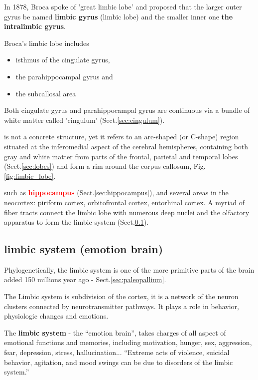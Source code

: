 In 1878, Broca spoke of 'great limbic lobe' and proposed that the larger outer
gyrus be named {\bf limbic gyrus} (limbic lobe) and the smaller inner one {\bf the
intralimbic gyrus}.

Broca's limbic lobe includes 
\begin{itemize}
  \item  isthmus of the cingulate gyrus, 
  
  \item the parahippocampal gyrus and
  
  \item the subcallosal area
\end{itemize}
Both cingulate gyrus and parahippocampal gyrus are continuous via
a bundle of white matter called 'cingulum' (Sect.\ref{sec:cingulum}).

is not a concrete structure, yet it refers to an
arc-shaped (or C-shape) region situated at the inferomedial aspect of the cerebral hemispheres,
containing both gray and white matter from parts of the frontal,
parietal and temporal lobes (Sect.\ref{sec:lobes}) and form a rim around
the corpus callosum, Fig.\ref{fig:limbic_lobe}.


 such as \textcolor{red}{\bf
hippocampus} (Sect.\ref{sec:hippocampus}), and several areas in the neocortex:
piriform cortex, orbitofrontal cortex, entorhinal cortex.
A myriad of fiber tracts connect the limbic lobe with numerous deep nuclei and
the olfactory apparatus to form the limbic system
(Sect.\ref{sec:limbic-system}).
   
\subsection{limbic system (emotion brain)}
\label{sec:limbic-system}

Phylogenetically, the limbic system is one of the more primitive parts of the
brain added 150 millions year ago - Sect.\ref{sec:paleopallium}. 

The Limbic system is subdivision of the cortex, it is a network of the neuron
clusters connected by neurotransmitter pathways. It plays a role in behavior,
physiologic changes and emotions. 

The {\bf limbic system} - the ``emotion brain'', takes charges of all aspect of
emotional functions and memories, including motivation, hunger, sex, aggression,
fear, depression, stress, hallucination...
``Extreme acts of violence, suicidal behavior, agitation, and mood swings can be
due to disorders of the limbic system.''

